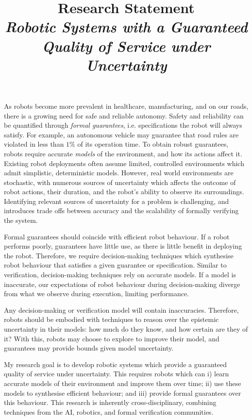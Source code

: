 \documentclass[11pt]{article}
\title{Research Statement\\ \large \emph{Robotic Systems with a Guaranteed Quality of Service under Uncertainty}}
\date{}
\author{}
\begin{document}
\maketitle
\thispagestyle{empty}

As robots become more prevalent in healthcare, manufacturing, and on our roads, there is a growing need for safe and reliable autonomy.
%
Safety and reliability can be quantified through \emph{formal guarantees}, i.e. specifications the robot will always satisfy.
%
For example, an autonomous vehicle may guarantee that road rules are violated in less than $1\%$ of its operation time.
%
To obtain robust guarantees, robots require accurate \emph{models} of the environment, and how its actions affect it.
%
Existing robot deployments often assume limited, controlled environments which admit simplistic, deterministic models.
%
However, real world environments are stochastic, with numerous sources of uncertainty which affects the outcome of robot actions, their duration, and the robot's ability to observe its surroundings.
%
Identifying relevant sources of uncertainty for a problem is challenging, and introduces trade offs between accuracy and the scalability of formally verifying the system.



Formal guarantees should coincide with efficient robot behaviour.
%
If a robot performs poorly, guarantees have little use, as there is little benefit in deploying the robot.
%
Therefore, we require decision-making techniques which synthesise robot behaviour that satisfies a given guarantee or specification.
%
Similar to verification, decision-making techniques rely on accurate models.
%
If a model is inaccurate, our expectations of robot behaviour during decision-making diverge from what we observe during execution, limiting performance.


Any decision-making or verification model will contain inaccuracies.
%
Therefore, robots should be embodied with techniques to reason over the epistemic uncertainty in their models: how much do they know, and how certain are they of it?
%
With this, robots may choose to explore to improve their model, and guarantees may provide bounds given model uncertainty.



My research goal is to develop robotic systems which provide a guaranteed quality of service under uncertainty.
%
This requires robots which can i) learn accurate models of their environment and improve them over time; ii) use these models to synthesise efficient behaviour; and iii) provide formal guarantees over this behaviour.
%
This research is inherently cross-disciplinary, combining techniques from the AI, robotics, and formal verification communities.

\end{document}
